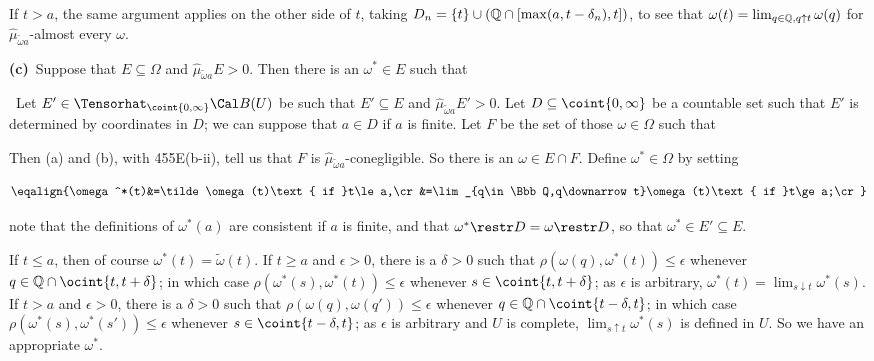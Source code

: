 { If $t>a$, the same argument applies on the other side of
$t$, taking $D_n=\{t\}\cup(\Bbb Q\cap[\max(a,t-\delta_n),t])$, to see that
$\omega(t)=\lim_{q\in\Bbb Q,q\uparrow t}\omega(q)$ for
$\hat\mu_{\tilde\omega a}$-almost every $\omega$.

\medskip

{\bf (c)}\grheada\ Suppose that $E\subseteq\Omega$ and
$\hat\mu_{\tilde\omega a}E>0$.   Then there is an $\omega^*\in E$ such that




\noindent\Prf\ Let $E'\in\Tensorhat_{\coint{0,\infty}}\Cal B(U)$ be such
that $E'\subseteq E$ and $\hat\mu_{\tilde\omega a}E'>0$.   Let
$D\subseteq\coint{0,\infty}$ be a countable set such that $E'$ is
determined by coordinates in $D$;  we can suppose that $a\in D$ if $a$ is
finite.   Let $F$ be the set of those $\omega\in\Omega$ such that




\noindent Then (a) and (b), with 455E(b-ii), tell us that $F$ is
$\hat\mu_{\tilde\omega a}$-conegligible.   So there is an
$\omega\in E\cap F$.    Define $\omega^*\in\Omega$ by setting

$$\eqalign{\omega^*(t)&=\tilde\omega(t)\text{ if }t\le a,\cr
&=\lim_{q\in\Bbb Q,q\downarrow t}\omega(t)\text{ if }t\ge a;\cr}$$

\noindent note that the definitions of $\omega^*(a)$ are consistent if $a$
is finite, and that $\omega^*\restr D=\omega\restr D$, so that
$\omega^*\in E'\subseteq E$.

If $t\le a$, then of course $\omega^*(t)=\tilde\omega(t)$.   If $t\ge a$
and $\epsilon>0$, there is a $\delta>0$ such that
$\rho(\omega(q),\omega^*(t))\le\epsilon$ whenever
$q\in\Bbb Q\cap\ocint{t,t+\delta}$;  in which case
$\rho(\omega^*(s),\omega^*(t))\le\epsilon$ whenever
$s\in\coint{t,t+\delta}$;  as $\epsilon$ is arbitrary,
$\omega^*(t)=\lim_{s\downarrow t}\omega^*(s)$.
If $t>a$ and $\epsilon>0$, there is a $\delta>0$ such that
$\rho(\omega(q),\omega(q'))\le\epsilon$ whenever
$q\in\Bbb Q\cap\coint{t-\delta,t}$;  in which case
$\rho(\omega^*(s),\omega^*(s'))\le\epsilon$ whenever
$s\in\coint{t-\delta,t}$;  as $\epsilon$ is arbitrary and $U$ is complete,
$\lim_{s\uparrow t}\omega^*(s)$ is defined in $U$.   So we have an
appropriate $\omega^*$.\ \Qed

}
